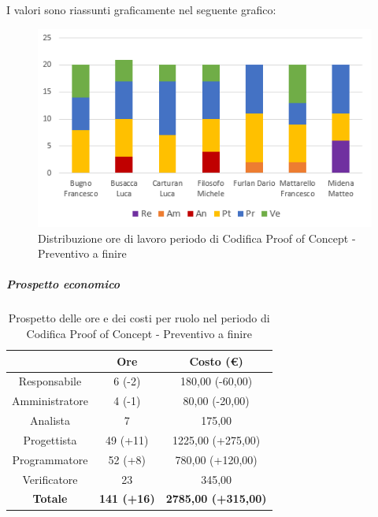 I valori sono riassunti graficamente nel seguente grafico:
\begin{figure}[H]
  \centering
  \includegraphics[scale=0.9]{immagini/ore_lavoro_preventivo_finire_PoC.png}
  \caption{Distribuzione ore di lavoro periodo di Codifica Proof of Concept - Preventivo a finire}
\end{figure}

\subparagraph{Prospetto economico} \label{subparagraph:prospetto_economico_PoC}

\begin{table}[H]
  \centering
  \renewcommand{\arraystretch}{1.8}
  \begin{tabular}{c|c|c}
    \rowcolor[HTML]{125E28}
    \multicolumn{1}{c}{\color[HTML]{FFFFFF}\textbf{Ruolo}}
                    & \multicolumn{1}{c}{\color[HTML]{FFFFFF}\textbf{Ore}}
                    & \multicolumn{1}{c}{\color[HTML]{FFFFFF}\textbf{Costo (€)}}                              \\
    \hline
    Responsabile    & 6 (-2)                                                     & 180,00 (-60,00)            \\
    Amministratore  & 4 (-1)                                                     & 80,00 (-20,00)             \\
    Analista        & 7                                                          & 175,00                     \\
    Progettista     & 49 (+11)                                                   & 1225,00 (+275,00)          \\
    Programmatore   & 52 (+8)                                                    & 780,00 (+120,00)           \\
    Verificatore    & 23                                                         & 345,00                     \\
    \textbf{Totale} & \textbf{141 (+16)}                                         & \textbf{2785,00 (+315,00)} \\
  \end{tabular}
  \caption{Prospetto delle ore e dei costi per ruolo nel periodo di Codifica Proof of Concept - Preventivo a finire}
\end{table}

